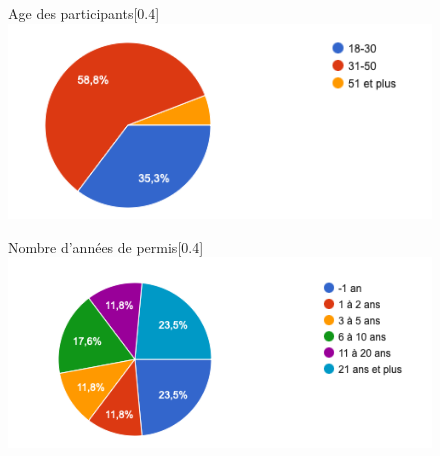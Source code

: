 \begin{figure}[H]
  \centering
  
  \begin{subcaptionbox}{Age des participants}[0.4\linewidth]
    {\includegraphics[width=\linewidth]{coeur_memoire/graphique/age.png}}
  \end{subcaptionbox}
  \hfill
  \begin{subcaptionbox}{Nombre d'années de permis}[0.4\linewidth]
    {\includegraphics[width=\linewidth]{coeur_memoire/graphique/nb_annees_permis.png}}
  \end{subcaptionbox}


\end{figure}
